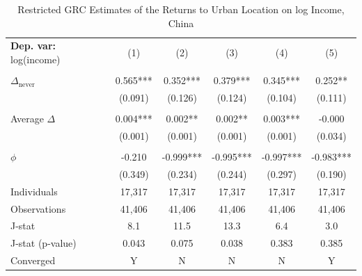 \begin{table}[htbp] \centering \begin{threeparttable}
 \caption{Restricted GRC Estimates of the Returns to Urban Location on log Income, China} 
 \label{tab:GRC_CHN_income_urban_unb} 
\begin{tabular}{l ccccc} \toprule  \textbf{Dep. var:}  log(income) 
                    &\multicolumn{1}{c}{(1)}   &\multicolumn{1}{c}{(2)}   &\multicolumn{1}{c}{(3)}   &\multicolumn{1}{c}{(4)}   &\multicolumn{1}{c}{(5)}   \\
                    &               &               &               &               &               \\
\addlinespace
$\Delta_{\text{never}}$&       0.565***&       0.352***&       0.379***&       0.345***&       0.252** \\
                    &     (0.091)   &     (0.126)   &     (0.124)   &     (0.104)   &     (0.111)   \\
                    &               &               &               &               &               \\
\addlinespace
Average $\Delta$    &       0.004***&       0.002** &       0.002** &       0.003***&      -0.000   \\
                    &     (0.001)   &     (0.001)   &     (0.001)   &     (0.001)   &     (0.034)   \\
                    &               &               &               &               &               \\
\addlinespace
$\phi$              &      -0.210   &      -0.999***&      -0.995***&      -0.997***&      -0.983***\\
                    &     (0.349)   &     (0.234)   &     (0.244)   &     (0.297)   &     (0.190)   \\
\addlinespace
Individuals         &      17,317   &      17,317   &      17,317   &      17,317   &      17,317   \\
Observations        &      41,406   &      41,406   &      41,406   &      41,406   &      41,406   \\
J-stat              &         8.1   &        11.5   &        13.3   &         6.4   &         3.0   \\
J-stat (p-value)    &       0.043   &       0.075   &       0.038   &       0.383   &       0.385   \\
Converged           &           Y   &           N   &           N   &           N   &           Y   \\

\end{tabular}
\end{threeparttable}
\end{table}
